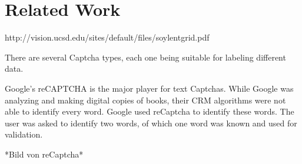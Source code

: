 \section{Related Work}
\label{sec:related_work}

http://vision.ucsd.edu/sites/default/files/soylentgrid.pdf

There are several Captcha types, each one being suitable for labeling different data.

Google's reCAPTCHA is the major player for text Captchas. While Google was analyzing  and making digital copies of books, their CRM algorithms were not able to identify every word. Google used reCaptcha to identify these words. The user was asked to identify two words, of which one word was known and used for validation.

*Bild von reCaptcha*

	\clearpage